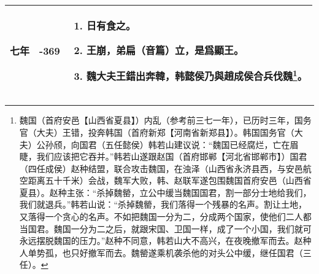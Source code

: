 \begin{longtable}{|>{\centering\scriptsize}m{2em}|>{\centering\scriptsize}m{1.3em}|>{\centering}m{8.8em}|}
  七年 & -369 & \begin{enumerate}
    \tiny
  \item 日有食之。
  \item 王崩，弟扁（音篇）立，是爲顯王。
  \item 魏大夫王錯出奔韓，韩懿侯乃與趙成侯合兵伐魏\footnote{魏国（首府安邑【山西省夏县】）内乱（参考前三七一年），已历时三年，国务官（大夫）王错，投奔韩国（首府新郑【河南省新郑县】）。韩国国务官（大夫）公孙颀，向国君（五任懿侯）韩若山建议说：“魏国已经腐烂，亡在眉睫，我们应该把它吞并。”韩若山遂跟赵国（首府邯郸【河北省邯郸市】）国君（四任成侯）赵种结盟，联合攻击魏国，在浊泽（山西省永济县西，与安邑航空距离五十千米）会战，魏军大败，韩、赵联军遂包围魏国首府安邑（山西省夏县）。赵种主张：“杀掉魏罃，立公中缓当魏国国君，割一部分士地给我们，我们就退兵。”韩若山说：“杀掉魏罃，我们落得一个残暴的名声。割让土地，又落得一个贪心的名声。不如把魏国一分为二，分成两个国家，使他们二人都当国君。魏国一分为二之后，就跟宋国、卫国一样，成了一个小国，我们就可永远摆脱魏国的压力。”赵种不同意，韩若山大不高兴，在夜晚撤军而去。赵种人单势孤，也只好撤军而去。魏罃遂乘机袭杀他的对头公中缓，继任国君（三任）。}。
  \end{enumerate} \tabularnewline
  \bottomrule
\end{longtable}

